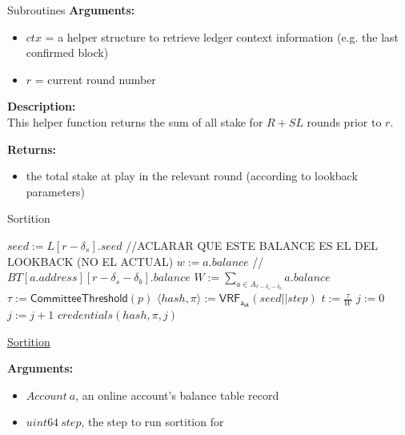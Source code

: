 \documentclass[10pt,a4paper]{article}
\begin{document}
\begin{section}{Subroutines}
\noindent \textbf{Arguments:}
\begin{itemize}
    \item $ctx$ = a helper structure to retrieve ledger context information (e.g. the last confirmed block)
    \item $r$ = current round number
  \end{itemize}


\noindent \textbf{Description:}\\
This helper function returns the sum of all stake for $R + SL$ rounds prior to $r$.

\noindent \textbf{Returns:}
\begin{itemize}
    \item the total stake at play in the relevant round (according to lookback parameters)
  \end{itemize}


\begin{algorithm}[H]
    \caption{Sortition}
    \label{algo:sortition}
    \begin{algorithmic}[1]
        \State $seed := L[r - \delta_s].seed$
        //ACLARAR QUE ESTE BALANCE ES EL DEL LOOKBACK (NO EL ACTUAL)
        \State $w := a.balance$ //$BT[a.address][r-\delta_s-\delta_b].balance$
        \State $W := \sum_{a \in A_{r-\delta_s-\delta_b}}a.balance$
        \State $\tau := \mathsf{CommitteeThreshold}(p)$
        \State $ \langle hash, \pi \rangle := \mathsf{VRF_{a_{sk}}}(seed||step)$
        \State $t := \frac{\tau}{W}$
        \State $j := 0$
        \While{$\frac{hash}{2^{hashlen}}\notin [ \sum_{k=0}^j\mathsf{B}(k;w,t), \sum_{k=0}^{j+1}\mathsf{B}(k;w,t))$}
            \State $j := j+1$
        \EndWhile
        \Return $credentials(hash, \pi, j)$
    \EndFunction
    \end{algorithmic}
    \caption{\underline{Sortition}}
\end{algorithm}


\noindent \textbf{Arguments:}
\begin{itemize}
    \item $Account \ a$, an online account's balance table record
    \item $uint64 \ step$, the step to run sortition for
\end{itemize}


\end{section}
\end{document}
